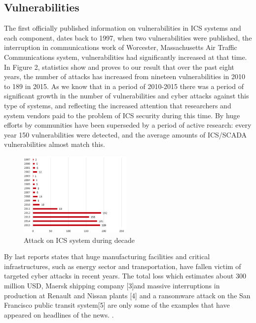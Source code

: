 \documentclass[conference]{IEEEtran}
\begin{document}
\subsection{Vulnerabilities}
The first officially published information on vulnerabilities in ICS systems and each component, dates back to 1997, when two vulnerabilities were published, the interruption in communications work of Worcester, Massachusetts Air Traffic Communications system,
vulnerabilities had significantly increased at that time. In Figure 2,  statistics show and proves to our result that over the past eight years, the number of attacks has increased
from nineteen vulnerabilities in 2010 to 189  in 2015. As we know that in a period of 2010-2015 there was a
period of significant growth in the number of vulnerabilities and cyber attacks against this type of systems, and reflecting the increased attention that
researchers and system vendors paid to the problem of ICS  security during this time.
By huge efforts by communities have  been superseded by a period of active research: every year 
150 vulnerabilities were detected, and the average amounts of ICS/SCADA vulnerabilities almost match this.

\begin{figure}[!htb]
	\includegraphics[width=0.49\textwidth]{images/scada2.png}
	\caption{  Attack on ICS system during decade}
	\label{fig:TCPIP}
\end{figure}
By last reports states that huge manufacturing facilities and critical infrastructures, such as energy sector and transportation, have fallen victim of targeted cyber attacks in recent years. The total loss which estimates about 300 million USD,  Maersk shipping company [3]and massive interruptions in production at Renault and Nissan plants [4] and a ransomware attack on the San Francisco public transit system[5] are only some of the examples that have appeared on headlines of the news.
.
\end{document}
